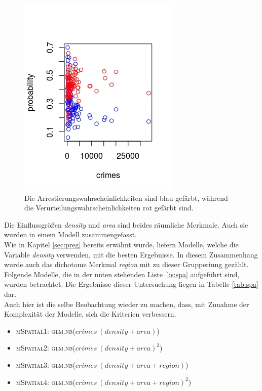 \begin{figure}
\centering
\includegraphics[scale=0.7]{./jpgs/prvc.jpeg}
\caption{Die Arrestierungswahrscheinlichkeiten sind blau gef\"arbt, w\"ahrend die Verurteilungswahrscheinlichkeiten rot gef\"arbt sind.}
\label{fig:nbd}
\end{figure}


\par\smallskip
Die Einflussgr\"o\ss{}en \textit{density} und \textit{area} sind beides r\"aumliche Merkmale. Auch sie wurden in einem Modell zusammengefasst. \\
Wie in Kapitel \ref{sec:preg} bereits erw\"ahnt wurde, liefern Modelle, welche die Variable \textit{density} verwenden, mit die besten Ergebnisse.
In diesem Zusammenhang wurde auch das dichotome Merkmal \textit{region} mit zu dieser Grupperiung gez\"ahlt. \\
Folgende Modelle, die in der unten stehenden Liste \ref{lis:spa} aufgef\"uhrt sind, wurden betrachtet.
Die Ergebnisse dieser Untersuchung liegen in Tabelle \ref{tab:spa} dar. \\
Auch hier ist die selbe Beobachtung wieder zu machen, dass, mit Zunahme der Komplexit\"at der Modelle, sich die Kriterien verbessern.

\begin{itemize}
\item \textsc{mSpatial1: glm.nb($crimes~(density+area)$)}
\item \textsc{mSpatial2: glm.nb($crimes~(density+area)^2$)}
\item \textsc{mSpatial3: glm.nb($crimes~(density+area+region)$)}
\item \textsc{mSpatial4: glm.nb($crimes~(density+area+region)^2$)}
\label{lis:spa}
\end{itemize}

